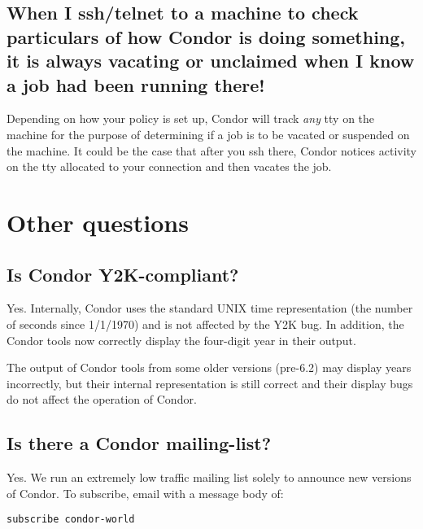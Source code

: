 \subsection{When I ssh/telnet to a machine to check particulars of how
Condor is doing something, it is always vacating or unclaimed when I
know a job had been running there!}

Depending on how your policy is set up, Condor will track \emph{any} tty
on the machine for the purpose of determining if a job is to be vacated
or suspended on the machine. It could be the case that after you ssh
there, Condor notices activity on the tty allocated to your connection
and then vacates the job.


\section{Other questions}

\subsection{Is Condor Y2K-compliant?}

Yes.
Internally, Condor uses the standard UNIX time representation (the
number of seconds since 1/1/1970) and is not affected by the Y2K bug.
In addition, the Condor tools now correctly display the four-digit
year in their output.

The output of Condor tools from some older versions (pre-6.2) may
display years incorrectly, but their internal representation is still
correct and their display bugs do not affect the operation of Condor.


\subsection{Is there a Condor mailing-list?}

Yes.
We run an extremely low traffic mailing list solely to announce new
versions of Condor.
To subscribe, email  with a message body
of:

\begin{verbatim}subscribe condor-world\end{verbatim}

